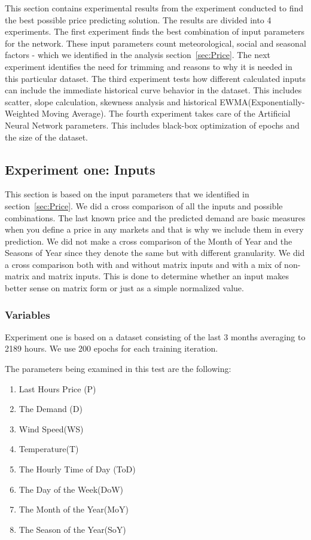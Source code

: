 This section contains experimental results from the experiment conducted to find the best possible price predicting solution. The results are divided into 4 experiments. The first experiment finds the best combination of input parameters for the network. These input parameters count meteorological, social and seasonal factors - which we identified in the analysis section~\ref{sec:Price}. The next experiment identifies the need for trimming and reasons to why it is needed in this particular dataset. The third experiment tests how different calculated inputs can include the immediate historical curve behavior in the dataset. This includes scatter, slope calculation, skewness analysis and historical EWMA(Exponentially-Weighted Moving Average). The fourth experiment takes care of the Artificial Neural Network parameters. This includes black-box optimization of epochs and the size of the dataset.

\subsection{Experiment one: Inputs}
\label{sec:priceExperimentOne}
This section is based on the input parameters that we identified in section~\ref{sec:Price}. We did a cross comparison of all the inputs and possible combinations. The last known price and the predicted demand are basic measures when you define a price in any markets and that is why we include them in every prediction. We did not make a cross comparison of the Month of Year and the Seasons of Year since they denote the same but with different granularity. We did a cross comparison both with and without matrix inputs and with a mix of non-matrix and matrix inputs. This is done to determine whether an input makes better sense on matrix form or just as a simple normalized value. 

\subsubsection{Variables}
Experiment one is based on a dataset consisting of the last 3 months averaging to 2189 hours. We use 200 epochs for each training iteration.

The parameters being examined in this test are the following:
\begin{enumerate}
	\item Last Hours Price (P)
	\item The Demand (D)
	\item Wind Speed(WS)
	\item Temperature(T)
	\item The Hourly Time of Day (ToD)
	\item The Day of the Week(DoW)
	\item The Month of the Year(MoY)
	\item The Season of the Year(SoY)
\end{enumerate}


